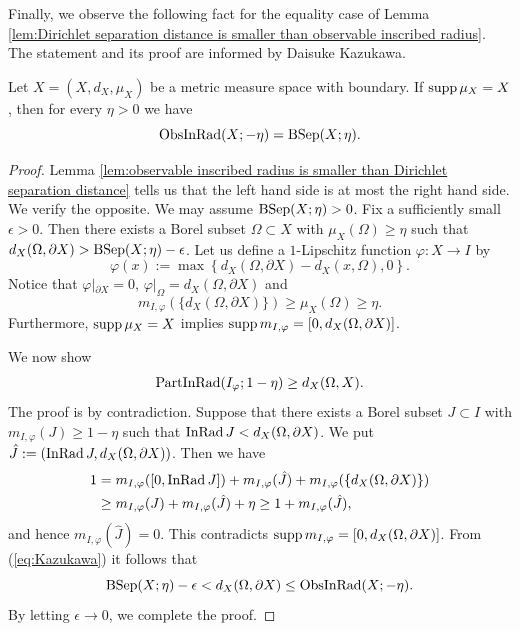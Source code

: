 Finally,
we observe the following fact for the equality case of Lemma \ref{lem:Dirichlet separation distance is smaller than observable inscribed radius}.
The statement and its proof are informed by Daisuke Kazukawa.
\begin{prop}\label{prop:Kazukawa}
Let $X=(X,d_{X},\mu_{X})$ be a metric measure space with boundary.
If $\mathrm{supp}\, \mu_{X}=X$,
then for every $\eta>0$
we have
\begin{equation*}
\operatorname{ObsInRad}(X;-\eta)=\operatorname{BSep}(X;\eta).
\end{equation*}
\end{prop}
\begin{proof}
Lemma \ref{lem:observable inscribed radius is smaller than Dirichlet separation distance} tells us that
the left hand side is at most the right hand side.
We verify the opposite.
We may assume $\operatorname{BSep}(X;\eta)>0$.
Fix a sufficiently small $\epsilon>0$.
Then there exists a Borel subset $\Omega \subset X$ with $\mu_{X}(\Omega) \geq \eta$ such that $d_{X}(\Omega,\partial X) >\operatorname{BSep}(X;\eta)-\epsilon$.
Let us define a $1$-Lipschitz function $\varphi:X\to I$ by
\begin{equation*}
\varphi(x):=\max \left\{d_{X}(\Omega,\partial X)-d_{X}(x,\Omega),0\right\}.
\end{equation*}
Notice that
$\varphi|_{\partial X}=0,\,\varphi|_{\Omega}=d_{X}(\Omega,\partial X)$ and
\begin{equation*}
m_{I,\varphi}(\{ d_{X}(\Omega,\partial X)\})\geq \mu_{X}(\Omega) \geq \eta.
\end{equation*}
Furthermore,
$\mathrm{supp}\, \mu_{X}=X$ implies $\mathrm{supp}\, m_{I,\varphi}=[0,d_{X}(\Omega,\partial X)]$.

We now show
\begin{equation}\label{eq:Kazukawa}
\operatorname{PartInRad}(I_{\varphi};1-\eta) \geq d_{X}(\Omega,X).
\end{equation}
The proof is by contradiction.
Suppose that
there exists a Borel subset $J \subset I$ with $m_{I,\varphi}(J)\geq 1-\eta$ such that $\operatorname{InRad} J<d_{X}(\Omega,\partial X)$.
We put $\hat{J}:=(\operatorname{InRad} J, d_{X}(\Omega,\partial X))$.
Then we have
\begin{align*}
1&   =   m_{I,\varphi}([0,\operatorname{InRad} J])+m_{I,\varphi}(\hat{J})+m_{I,\varphi}(\{ d_{X}(\Omega,\partial X)\})\\
  &\geq m_{I,\varphi}(J)+m_{I,\varphi}(\hat{J})+\eta \geq 1+m_{I,\varphi}(\hat{J}),
\end{align*}
and hence $m_{I,\varphi}(\hat{J})=0$.
This contradicts $\mathrm{supp}\, m_{I,\varphi}=[0,d_{X}(\Omega,\partial X)]$.
From (\ref{eq:Kazukawa})
it follows that
\begin{equation*}
\operatorname{BSep}(X;\eta)-\epsilon<d_{X}(\Omega,\partial X) \leq \operatorname{ObsInRad}(X;-\eta).
\end{equation*}
By letting $\epsilon \to 0$,
we complete the proof.
\end{proof}